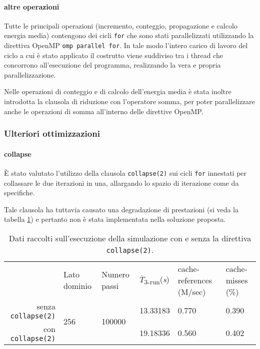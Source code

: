 \paragraph{altre operazioni}
Tutte le principali operazioni (incremento, conteggio, propagazione e calcolo
energia media) contengono dei cicli \texttt{for} che sono stati parallelizzati
utilizzando la direttiva OpenMP \texttt{omp parallel for}.  In tale modo
l'intero carico di lavoro del ciclo a cui è stato applicato il costrutto viene
suddiviso tra i thread che concorrono all'esecuzione del programma, realizzando
la vera e propria parallelizzazione.

Nelle operazioni di conteggio e di calcolo dell'energia media è stata inoltre
introdotta la clausola di riduzione con l'operatore somma, per poter
parallelizzare anche le operazioni di somma all'interno delle direttive OpenMP\@.

\subsubsection{Ulteriori ottimizzazioni}

\paragraph{collapse}

È stato valutato l'utilizzo della clausola \texttt{collapse(2)} sui cicli
\texttt{for} innestati per collassare le due iterazioni in una, allargando lo
spazio di iterazione come da specifiche\cite{openmp2018reference}.

Tale clausola ha tuttavia causato una degradazione di prestazioni (si veda la
tabella \ref{tab:collapse}) e pertanto non è stata implementata nella soluzione
proposta.

\begin{table}[ht]
\begin{tabularx}{\linewidth}{rXXXXX}
\cmidrule[\heavyrulewidth]{2-6}
& Lato dominio & Numero passi & $\overline{T}$\textsubscript{3-run}(\textit{s})
& cache-references (M/sec) & cache-misses (\%)\footnotemark{}\\
\cmidrule[\lightrulewidth]{2-6}
senza \texttt{collapse(2)} & \multirow{2}{*}{256} & \multirow{2}{*}{100000} &
   13.33183 & 0.770 & 0.390\\
\cmidrule{4-6}
   con \texttt{collapse(2)} &&& 19.18336 & 0.560 & 0.402\\
\cmidrule[\heavyrulewidth]{2-6}
\end{tabularx}
\caption{\label{tab:collapse}Dati raccolti sull'esecuzione della simulazione con
e senza la direttiva \texttt{collapse(2)}.}
\end{table}


